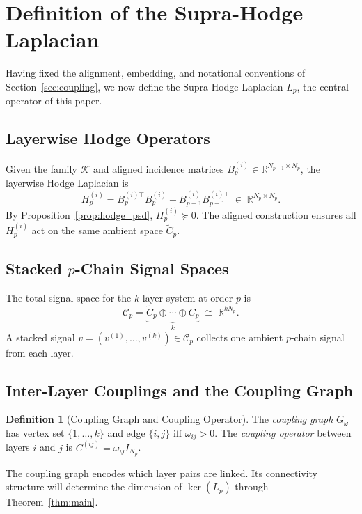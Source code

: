 \documentclass[11pt]{article}
\theoremstyle{definition}
\newtheorem{definition}[theorem]{Definition}
\theoremstyle{remark}
\newcommand{\R}{\mathbb{R}}
\newcommand{\Ctil}{\widetilde{C}}
\newcommand{\Gom}{G_\omega}
\newcommand{\calK}{\mathcal{K}}
\newcommand{\calC}{\mathcal{C}}
\begin{document}
\section{Definition of the Supra-Hodge Laplacian}
\label{sec:defn}

Having fixed the alignment, embedding, and notational conventions of
Section~\ref{sec:coupling}, we now define the Supra-Hodge Laplacian $L_p$, the
central operator of this paper.

\subsection{Layerwise Hodge Operators}

Given the family $\calK$ and aligned incidence matrices $B_p^{(i)}\in
\R^{N_{p-1}\times N_p}$, the layerwise Hodge Laplacian is
\[
  H_p^{(i)} = B_p^{(i)\top}B_p^{(i)} + B_{p+1}^{(i)}B_{p+1}^{(i)\top}
  \;\in\; \R^{N_p\times N_p}.
\]
By Proposition~\ref{prop:hodge_psd}, $H_p^{(i)}\succeq 0$. The aligned
construction ensures all $H_p^{(i)}$ act on the same ambient space $\Ctil_p$.

\subsection{Stacked $p$-Chain Signal Spaces}

The total signal space for the $k$-layer system at order $p$ is
\[
  \calC_p = \underbrace{\Ctil_p \oplus \cdots \oplus \Ctil_p}_{k}
  \;\cong\; \R^{kN_p}.
\]
A stacked signal $v=(v^{(1)},\dots,v^{(k)})\in\calC_p$ collects one ambient
$p$-chain signal from each layer.

\subsection{Inter-Layer Couplings and the Coupling Graph}

\begin{definition}[Coupling Graph and Coupling Operator]
The \emph{coupling graph} $\Gom$ has vertex set $\{1,\dots,k\}$ and edge
$\{i,j\}$ iff $\omega_{ij}>0$. The \emph{coupling operator} between layers $i$
and $j$ is $C^{(ij)}=\omega_{ij}I_{N_p}$.
\end{definition}

The coupling graph encodes which layer pairs are linked. Its connectivity
structure will determine the dimension of $\ker(L_p)$ through
Theorem~\ref{thm:main}.
\end{document}
